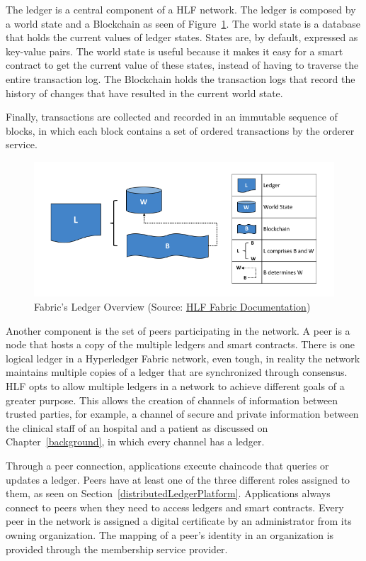 The ledger is a central component of a HLF network. The ledger is composed by a
world state and a Blockchain as seen of Figure~\ref{fig:ledgerFabric}. The
world state is a database that holds the current values of ledger states.
States are, by default, expressed as key-value pairs. The world state is useful
because it makes it easy for a smart contract to get the current value of these
states, instead of having to traverse the entire transaction log. The
Blockchain holds the transaction logs that record the history of changes that
have resulted in the current world state.

Finally, transactions are collected and recorded in an immutable sequence of
blocks, in which each block contains a set of ordered transactions by the
orderer service.

\begin{figure}[ht] 
	\centering
	\includegraphics[width=1\linewidth]{imgs/ledgerFabric.png}
  \caption{\label{fig:ledgerFabric}Fabric's Ledger Overview (Source:
  \href{https://hyperledger-fabric.readthedocs.io/en/release-1.2/ledger/ledger.html}{HLF
  Fabric Documentation})}
\end{figure}

Another component is the set of peers participating in the network. A peer is a
node that hosts a copy of the multiple ledgers and smart contracts. There is
one logical ledger in a Hyperledger Fabric network, even tough, in reality the
network maintains multiple copies of a ledger that are synchronized through
consensus. HLF opts to allow multiple ledgers in a network to achieve different
goals of a greater purpose. This allows the creation of channels of information
between trusted parties, for example, a channel of secure and private
information between the clinical staff of an hospital and a patient as
discussed on Chapter~\ref{background}, in which every channel has a ledger.

Through a peer connection, applications execute chaincode that queries or
updates a ledger. Peers have at least one of the three different roles assigned
to them, as seen on Section~\ref{distributedLedgerPlatform}. Applications
always connect to peers when they need to access ledgers and smart contracts.
Every peer in the network is assigned a digital certificate by an administrator
from its owning organization. The mapping of a peer's identity in an
organization is provided through the membership service provider. 

